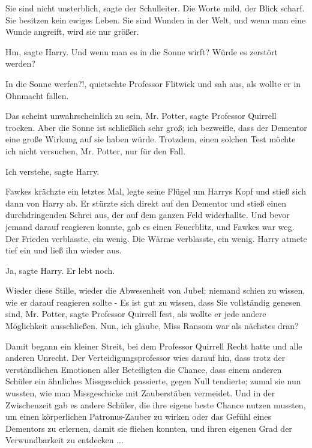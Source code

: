 \glqq{}Sie sind nicht unsterblich\grqq{}, sagte der Schulleiter. Die Worte mild,
der Blick scharf. \glqq{}Sie besitzen kein ewiges Leben. Sie sind Wunden in der
Welt, und wenn man eine Wunde angreift, wird sie nur größer.\grqq{}

\glqq{}Hm\grqq{}, sagte Harry. \glqq{}Und wenn man es in die Sonne wirft? Würde es
zerstört werden?\grqq{}

\glqq{}In die Sonne werfen?!\grqq{}, quietschte Professor Flitwick und sah aus,
als wollte er in Ohnmacht fallen.

\glqq{}Das scheint unwahrscheinlich zu sein, Mr. Potter\grqq{}, sagte Professor
Quirrell trocken. \glqq{}Aber die Sonne ist schließlich sehr groß; ich bezweifle,
dass der Dementor eine große Wirkung auf sie haben würde. Trotzdem, einen
solchen Test möchte ich nicht versuchen, Mr. Potter, nur für den Fall.\grqq{}

\glqq{}Ich verstehe\grqq{}, sagte Harry.

Fawkes krächzte ein letztes Mal, legte seine Flügel um Harrys Kopf und stieß
sich dann von Harry ab. Er stürzte sich direkt auf den Dementor und stieß einen
durchdringenden Schrei aus, der auf dem ganzen Feld widerhallte. Und bevor
jemand darauf reagieren konnte, gab es einen Feuerblitz, und Fawkes war weg. Der
Frieden verblasste, ein wenig. Die Wärme verblasste, ein wenig. Harry atmete
tief ein und ließ ihn wieder aus.

\glqq{}Ja\grqq{}, sagte Harry. \glqq{}Er lebt noch.\grqq{}

Wieder diese Stille, wieder die Abwesenheit von Jubel; niemand schien zu wissen,
wie er darauf reagieren sollte - \glqq{}Es ist gut zu wissen, dass Sie
vollständig genesen sind, Mr. Potter\grqq{}, sagte Professor Quirrell fest, als
wollte er jede andere Möglichkeit ausschließen. \glqq{}Nun, ich glaube, Miss
Ransom war als nächstes dran?\grqq{}

Damit begann ein kleiner Streit, bei dem Professor Quirrell Recht hatte und alle
anderen Unrecht. Der Verteidigungsprofessor wies darauf hin, dass trotz der
verständlichen Emotionen aller Beteiligten die Chance, dass einem anderen
Schüler ein ähnliches Missgeschick passierte, gegen Null tendierte; zumal sie
nun wussten, wie man Missgeschicke mit Zauberstäben vermeidet. Und in der
Zwischenzeit gab es andere Schüler, die ihre eigene beste Chance nutzen mussten,
um einen körperlichen Patronus-Zauber zu wirken oder das Gefühl eines Dementors
zu erlernen, damit sie fliehen konnten, und ihren eigenen Grad der
Verwundbarkeit zu entdecken ...

